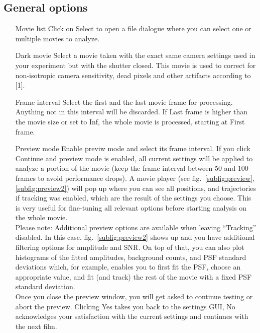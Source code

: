 \documentclass[11pt,onside]{report}
\numberwithin{equation}{chapter}
\begin{document}
\subsection*{General options}
\begin{itemize}[leftmargin=2cm]
\item[Movie list] Click on \textsf{Select} to open a file dialogue where you can select one or multiple movies to analyze.
\item[Dark movie] Select a movie taken with the exact same camera settings used in your experiment but with the shutter closed. This movie is used to correct for non-isotropic camera sensitivity, dead pixels and other artifacts according to [1].
\item[Frame interval] Select the first and the last movie frame for processing. Anything not in this interval will be discarded. If \textsf{Last frame} is higher than the movie size or set to \textsf{Inf}, the whole movie is processed, starting at \textsf{First frame}.
\item[Preview mode] Enable previw mode and select its frame interval. If you click \textsf{Continue} and preview mode is enabled, all current settings will be applied to analyze a portion of the movie (keep the frame interval between 50 and 100 frames to avoid performance drops). A movie player (see fig.~\ref{subfig:preview},\ref{subfig:preview2}) will pop up where you can see all positions, and trajectories if tracking was enabled, which are the result of the settings you choose. This is very useful for fine-tuning all relevant options before starting analysis on the whole movie.\\
Please note: Additional preview options are available when leaving ``Tracking'' disabled. In this case. fig.~\ref{subfig:preview2} shows up and you have additional filtering options for amplitude and SNR. On top of that, you can also plot histograms of the fitted amplitudes, background counts, and PSF standard deviations which, for example, enables you to first fit the PSF, choose an appropriate value, and fit (and track) the rest of the movie with a fixed PSF standard deviation.\\
Once you close the preview window, you will get asked to continue testing or abort the preview. Clicking \textsf{Yes} takes you back to the settings GUI, \textsf{No} acknowledges your satisfaction with the current settings and continues with the next film.
\end{itemize}
\end{document}

